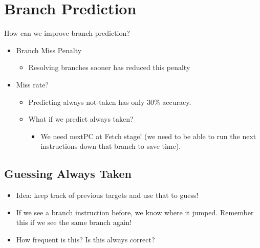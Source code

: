 \documentclass[10pt]{article}
\begin{document}
\section*{Branch Prediction}
How can we improve branch prediction?
\begin{itemize}
    \item Branch Miss Penalty
    \begin{itemize}
        \item Resolving branches sooner has reduced this penalty
    \end{itemize}
    \item Miss rate?
    \begin{itemize}
    \item Predicting always not-taken has only 30\% accuracy.
    \item What if we predict always taken?
    \begin{itemize}
        \item We need nextPC at Fetch stage!  (we need to be able to run the next instructions down that branch to save time).
    \end{itemize}
    \end{itemize}
\end{itemize}

\subsection*{Guessing Always Taken}
\begin{itemize}
    \item Idea: keep track of previous targets and use that to guess!
    \item If we see a branch instruction before, we know where it jumped.  Remember this if we see the same branch again!
    \item How frequent is this?  Is this always correct?
\end{itemize}
\end{document}
